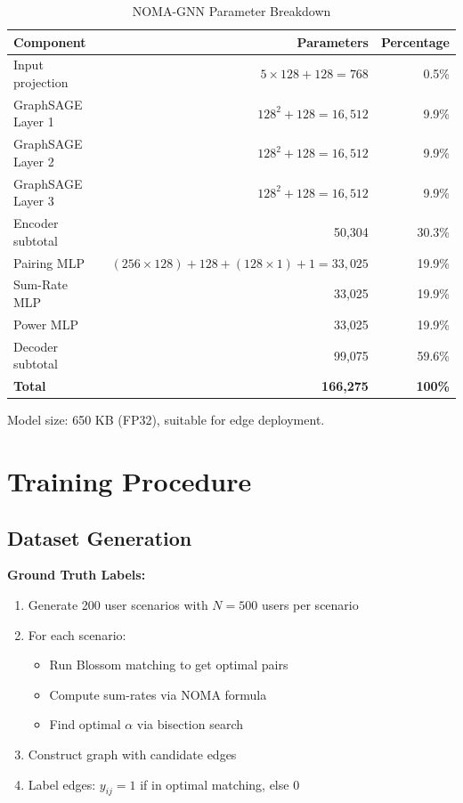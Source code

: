 \begin{table}[H]
\centering
\begin{tabular}{lrr}
\toprule
\textbf{Component} & \textbf{Parameters} & \textbf{Percentage} \\
\midrule
Input projection & $5 \times 128 + 128 = 768$ & 0.5\% \\
GraphSAGE Layer 1 & $128^2 + 128 = 16,512$ & 9.9\% \\
GraphSAGE Layer 2 & $128^2 + 128 = 16,512$ & 9.9\% \\
GraphSAGE Layer 3 & $128^2 + 128 = 16,512$ & 9.9\% \\
\midrule
Encoder subtotal & 50,304 & 30.3\% \\
\midrule
Pairing MLP & $(256 \times 128) + 128 + (128 \times 1) + 1 = 33,025$ & 19.9\% \\
Sum-Rate MLP & 33,025 & 19.9\% \\
Power MLP & 33,025 & 19.9\% \\
\midrule
Decoder subtotal & 99,075 & 59.6\% \\
\midrule
\textbf{Total} & \textbf{166,275} & \textbf{100\%} \\
\bottomrule
\end{tabular}
\caption{NOMA-GNN Parameter Breakdown}
\end{table}

Model size: 650 KB (FP32), suitable for edge deployment.

\section{Training Procedure}

\subsection{Dataset Generation}

\textbf{Ground Truth Labels:}
\begin{enumerate}
    \item Generate 200 user scenarios with $N = 500$ users per scenario
    \item For each scenario:
    \begin{itemize}
        \item Run Blossom matching to get optimal pairs
        \item Compute sum-rates via NOMA formula
        \item Find optimal $\alpha$ via bisection search
    \end{itemize}
    \item Construct graph with candidate edges
    \item Label edges: $y_{ij} = 1$ if in optimal matching, else 0
\end{enumerate}

